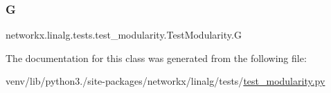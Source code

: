 \subsubsection{\texorpdfstring{G}{G}}
{\footnotesize\ttfamily networkx.\+linalg.\+tests.\+test\+\_\+modularity.\+Test\+Modularity.\+G}



The documentation for this class was generated from the following file\+:\begin{DoxyCompactItemize}
\item 
venv/lib/python3./site-\/packages/networkx/linalg/tests/\hyperlink{test__modularity_8py}{test\+\_\+modularity.\+py}\end{DoxyCompactItemize}
